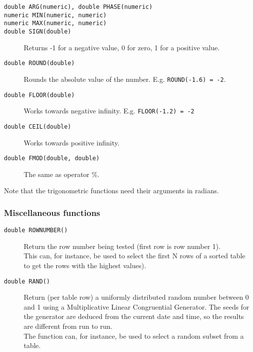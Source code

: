 \begin{description}
  \item[ \texttt{double ARG(numeric),  double PHASE(numeric)}]
  \item[ \texttt{numeric MIN(numeric, numeric)}]
  \item[ \texttt{numeric MAX(numeric, numeric)}]
  \item[ \texttt{double SIGN(double)}]
       Returns -1 for a negative value, 0 for zero, 1 for a positive value.
  \item[ \texttt{double ROUND(double)}]
       Rounds the absolute value of the number.
       E.g. \texttt{ROUND(-1.6) = -2}.
  \item[ \texttt{double FLOOR(double)}]
       Works towards negative infinity.
       E.g. \texttt{FLOOR(-1.2) = -2}
  \item[ \texttt{double CEIL(double)}] Works towards positive infinity.
  \item[ \texttt{double FMOD(double, double)}] The same as operator \%.
\end{description}
Note that the trigonometric functions need their arguments in radians.

\subsubsection{Miscellaneous functions}
\begin{description}
  \item[ \texttt{double ROWNUMBER()}]
       Return the row number being tested (first row is row number 1).
       \\This can, for instance, be used to select the first N rows
       of a sorted table to get the rows with the highest values).
  \item[ \texttt{double RAND()}]
       Return (per table row) a uniformly distributed random number
       between 0 and 1 using a Multiplicative Linear Congruential Generator.
       The seeds for the generator are deduced from the current date and
       time, so the results are different from run to run.
       \\The function can, for instance, be used to select a random
       subset from a table.
\end{description}

\label{TAQL:COLUMNS}
